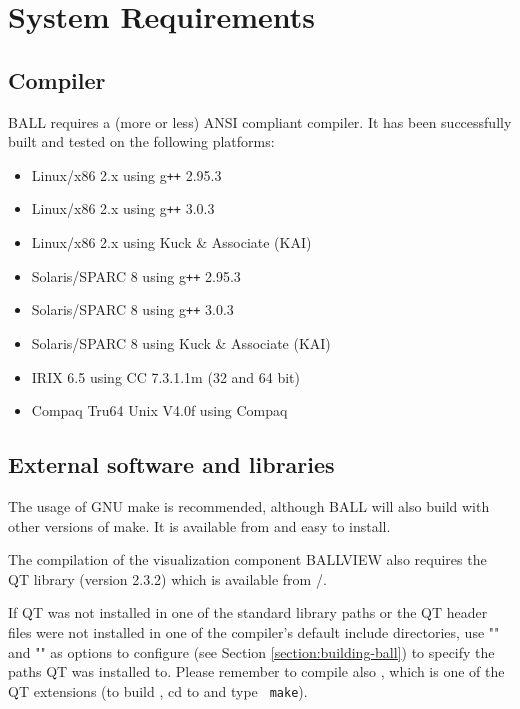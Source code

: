 \section{System Requirements}

\subsection{Compiler}
  BALL requires a (more or less) ANSI compliant \CPP compiler.
  It has been successfully built and tested on the following platforms:
	\begin{itemize}	
   	\item Linux/x86 2.x using g{\tt ++} 2.95.3
   	\item Linux/x86 2.x using g{\tt ++} 3.0.3
   	\item Linux/x86 2.x using Kuck \& Associate (KAI) 
   	\item Solaris/SPARC 8 using g{\tt ++} 2.95.3
   	\item Solaris/SPARC 8 using g{\tt ++} 3.0.3
   	\item Solaris/SPARC 8 using Kuck \& Associate (KAI) 
   	\item IRIX 6.5 using CC 7.3.1.1m (32 and 64 bit)
   	\item Compaq Tru64 Unix V4.0f using Compaq 
 	\end{itemize}

\subsection{External software and libraries}
The usage of GNU make is recommended, although BALL will also build with
other versions of make. It is available from 
and easy to install.

The compilation of the visualization component BALLVIEW also requires
the QT library (version 2.3.2) which is available from
/.

If QT was not installed in one of the standard library paths or the
QT header files were not installed in one of the compiler's default
include directories, use \mbox{""} and
\mbox{""} as
options to configure (see Section \ref{section:building-ball}) to specify the paths
QT was installed to.
Please remember to compile also , which is one of the QT extensions
(to build , cd to {\tt{}} and type {\tt
make}).

